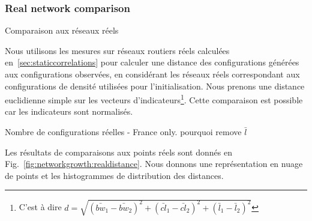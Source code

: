 %



\subsubsection{Real network comparison}{Comparaison aux réseaux réels}


Nous utilisons les mesures sur réseaux routiers réels calculées en~\ref{sec:staticcorrelations} pour calculer une distance des configurations générées aux configurations observées, en considérant les réseaux réels correspondant aux configurations de densité utilisées pour l'initialisation. Nous prenons une distance euclidienne simple sur les vecteurs d'indicateurs\footnote{C'est à dire $d = \sqrt{(\bar{bw}_1 - \bar{bw}_2)^2 + (\bar{cl}_1 - \bar{cl}_2)^2 + (\bar{l}_1 - \bar{l}_2)^2}$}. Cette comparaison est possible car les indicateurs sont normalisés.

Nombre de configurations réelles - France only.
pourquoi remove $\bar{l}$

Les résultats de comparaisons aux points réels sont donnés en Fig.~\ref{fig:networkgrowth:realdistance}. Nous donnons une représentation en nuage de points et les histogrammes de distribution des distances.



